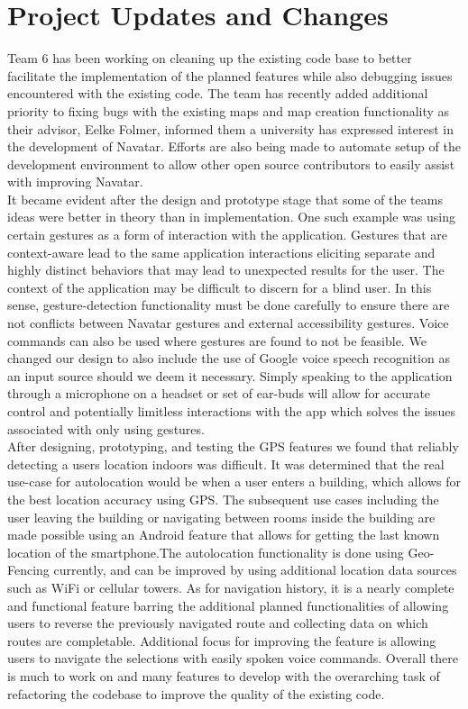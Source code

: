 \documentclass{scrreprt}
\begin{document}
\chapter{Project Updates and Changes}
Team 6 has been working on cleaning up the existing code base to better facilitate the implementation of the planned features while also debugging issues encountered with the existing code. The team has recently added additional priority to fixing bugs with the existing maps and map creation functionality as their advisor, Eelke Folmer, informed them a university has expressed interest in the development of Navatar. Efforts are also being made to automate setup of the development environment to allow other open source contributors to easily assist with improving Navatar.\\

It became evident after the design and prototype stage that some of the team\textsc{}s ideas were better in theory than in implementation. One such example was using certain gestures as a form of interaction with the application. Gestures that are context-aware lead to the same application interactions eliciting separate and highly distinct behaviors that may lead to unexpected results for the user. The context of the application may be difficult to discern for a blind user. In this sense, gesture-detection functionality must be done carefully to ensure there are not conflicts between Navatar gestures and external accessibility gestures. Voice commands can also be used where gestures are found to not be feasible. We changed our design to also include the use of Google voice speech recognition as an input source should we deem it necessary. Simply speaking to the application through a microphone on a headset or set of ear-buds will allow for accurate control and potentially limitless interactions with the app which solves the issues associated with only using gestures.\\

After designing, prototyping, and testing the GPS features we found that reliably detecting a user\textsc{}s location indoors was difficult. It was determined that the real use-case for autolocation would be when a user enters a building, which allows for the best location accuracy using GPS. The subsequent use cases including the user leaving the building or navigating between rooms inside the building are made possible using an Android feature that allows for getting the last known location of the smartphone.The autolocation functionality is done using Geo-Fencing currently, and can be improved by using additional location data sources such as WiFi or cellular towers. As for navigation history, it is a nearly complete and functional feature barring the additional planned functionalities of allowing users to reverse the previously navigated route and collecting data on which routes are completable. Additional focus for improving the feature is allowing users to navigate the selections with easily spoken voice commands. Overall there is much to work on and many features to develop with the overarching task of refactoring the codebase to improve the quality of the existing code.
\end{document}
